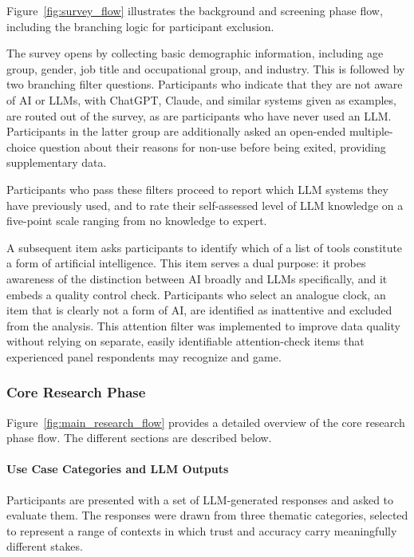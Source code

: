 Figure~\ref{fig:survey_flow} illustrates the background and screening phase flow, including the branching logic for participant exclusion.

The survey opens by collecting basic demographic information, including age group, gender, job title and occupational group, and industry. This is followed by two branching filter questions. Participants who indicate that they are not aware of AI or LLMs, with ChatGPT, Claude, and similar systems given as examples, are routed out of the survey, as are participants who have never used an LLM. Participants in the latter group are additionally asked an open-ended multiple-choice question about their reasons for non-use before being exited, providing supplementary data.

Participants who pass these filters proceed to report which LLM systems they have previously used, and to rate their self-assessed level of LLM knowledge on a five-point scale ranging from no knowledge to expert. 

A subsequent item asks participants to identify which of a list of tools constitute a form of artificial intelligence. This item serves a dual purpose: it probes awareness of the distinction between AI broadly and LLMs specifically, and it embeds a quality control check. Participants who select an analogue clock, an item that is clearly not a form of AI, are identified as inattentive and excluded from the analysis. This attention filter was implemented to improve data quality without relying on separate, easily identifiable attention-check items that experienced panel respondents may recognize and game.

\subsubsection{Core Research Phase}
\label{sec:core_research}

Figure~\ref{fig:main_research_flow} provides a detailed overview of the core research phase flow. The different sections are described below.

\paragraph{Use Case Categories and LLM Outputs}
\label{sec:cat_and_llm_outputs}

Participants are presented with a set of LLM-generated responses and asked to evaluate them. The responses were drawn from three thematic categories, selected to represent a range of contexts in which trust and accuracy carry meaningfully different stakes. 

